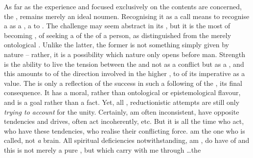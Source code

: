 As far as the experience and  focused exclusively on the
 contents are concerned, the ,  remains merely
an ideal noumen.   Recognising it as a call means to
recognise a  as a , a  to
.
%
The challenge may seem abstract in its , but it is the most
 of becoming , of seeking a  of the  of a person, as distinguished from the merely
ontological .  Unlike the latter, the former is not something
simply given by nature -- rather, it is a possibility which nature only opens
before man. Strength is the ability to live the tension between the
 and  not as a conflict but as a , and
this amounts to  of the direction involved in the higher
, to  of its  imperative as a
 value. The  is only a reflection of the
success in such a following of the , its final 
consequence. It has a moral, rather than ontological or epistemological flavour,
and is a goal rather than a fact. Yet, all , reductionistic
attempts are still only {\em trying to account} for the unity. Certainly,
 am often inconsistent,  have opposite tendencies and drives, 
often act incoherently, etc. But it is all the time  who act,  who
have these tendencies,  who realise their conflicting force.  am the
one who is called, not {\em a} brain. All 
spiritual deficiencies notwithstanding,  am ,  do have
 of  and this is not merely a pure , but  which  carry with me through \ldots the
